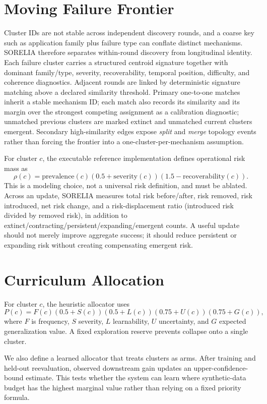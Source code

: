 \documentclass{article}
\begin{document}
\section{Moving Failure Frontier}
Cluster IDs are not stable across independent discovery rounds, and a coarse key such as application family plus failure type can conflate distinct mechanisms. SORELIA therefore separates within-round discovery from longitudinal identity. Each failure cluster carries a structured centroid signature together with dominant family/type, severity, recoverability, temporal position, difficulty, and coherence diagnostics. Adjacent rounds are linked by deterministic signature matching above a declared similarity threshold. Primary one-to-one matches inherit a stable mechanism ID; each match also records its similarity and its margin over the strongest competing assignment as a calibration diagnostic; unmatched previous clusters are marked extinct and unmatched current clusters emergent. Secondary high-similarity edges expose \emph{split} and \emph{merge} topology events rather than forcing the frontier into a one-cluster-per-mechanism assumption.

For cluster $c$, the executable reference implementation defines operational risk mass as
\[
\rho(c)=\mathrm{prevalence}(c)(0.5+\mathrm{severity}(c))(1.5-\mathrm{recoverability}(c)).
\]
This is a modeling choice, not a universal risk definition, and must be ablated. Across an update, SORELIA measures total risk before/after, risk removed, risk introduced, net risk change, and a risk-displacement ratio (introduced risk divided by removed risk), in addition to extinct/contracting/persistent/expanding/emergent counts. A useful update should not merely improve aggregate success; it should reduce persistent or expanding risk without creating compensating emergent risk.

\section{Curriculum Allocation}
For cluster $c$, the heuristic allocator uses
\[
P(c)=F(c)(0.5+S(c))(0.5+L(c))(0.75+U(c))(0.75+G(c)),
\]
where $F$ is frequency, $S$ severity, $L$ learnability, $U$ uncertainty, and $G$ expected generalization value. A fixed exploration reserve prevents collapse onto a single cluster.

We also define a learned allocator that treats clusters as arms. After training and held-out reevaluation, observed downstream gain updates an upper-confidence-bound estimate. This tests whether the system can learn where synthetic-data budget has the highest marginal value rather than relying on a fixed priority formula.
\end{document}
